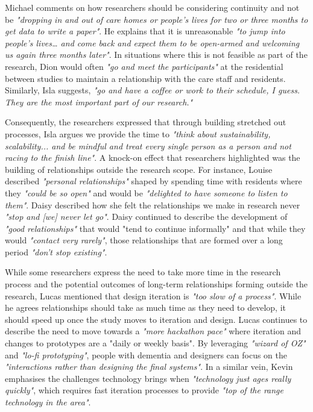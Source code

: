 Michael comments on how researchers should be considering continuity and not be \textit{"dropping in and out of care homes or people's lives for two or three months to get data to write a paper"}. He explains that it is unreasonable \textit{"to jump into people's lives… and come back and expect them to be open-armed and welcoming us again three months later"}. In situations where this is not feasible as part of the research, Dion would often \textit{"go and meet the participants"} at the residential between studies to maintain a relationship with the care staff and residents. Similarly, Isla suggests, \textit{"go and have a coffee or work to their schedule, I guess. They are the most important part of our research."}

Consequently, the researchers expressed that through building stretched out processes, Isla argues we provide the time to \textit{"think about sustainability, scalability... and be mindful and treat every single person as a person and not racing to the finish line"}. A knock-on effect that researchers highlighted was the building of relationships outside the research scope. For instance, Louise described \textit{"personal relationships"} shaped by spending time with residents where they \textit{"could be so open"} and would be \textit{"delighted to have someone to listen to them"}. Daisy described how she felt the relationships we make in research never \textit{"stop and [we] never let go"}. Daisy continued to describe the development of \textit{"good relationships"} that would "tend to continue informally" and that while they would \textit{"contact very rarely"}, those relationships that are formed over a long period \textit{"don't stop existing"}. 

While some researchers express the need to take more time in the research process and the potential outcomes of long-term relationships forming outside the research, Lucas mentioned that design iteration is \textit{"too slow of a process"}. While he agrees relationships should take as much time as they need to develop, it should speed up once the study moves to iteration and design. Lucas continues to describe the need to move towards a \textit{"more hackathon pace"} where iteration and changes to prototypes are a "daily or weekly basis". By leveraging \textit{"wizard of OZ"} and\textit{ "lo-fi prototyping"}, people with dementia and designers can focus on the \textit{"interactions rather than designing the final systems"}. In a similar vein, Kevin emphasises the challenges technology brings when \textit{"technology just ages really quickly"}, which requires fast iteration processes to provide \textit{"top of the range technology in the area"}. 

